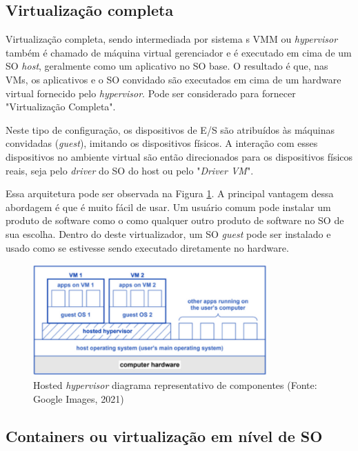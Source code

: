 \subsection{Virtualização completa}

Virtualização completa, sendo intermediada por sistema s VMM ou \emph{hypervisor} também é chamado de máquina virtual gerenciador e é executado em cima de um SO \emph{host}, geralmente como um aplicativo no SO base. O resultado é que, nas VMs, os aplicativos e o SO convidado são executados em cima de um hardware virtual fornecido pelo \emph{hypervisor}. Pode ser considerado para fornecer "Virtualização Completa".

Neste tipo de configuração, os dispositivos de E/S são atribuídos às máquinas convidadas (\emph{guest}), imitando os dispositivos físicos. A interação com esses dispositivos no ambiente virtual são então direcionados para os dispositivos físicos reais, seja pelo \emph{driver} do SO do host ou pelo "\emph{Driver VM}". 

Essa arquitetura pode ser observada na Figura \ref{fig:vms}. A principal vantagem dessa abordagem é que é muito fácil de usar. Um usuário comum pode instalar um produto de software como o  como qualquer outro produto de software no SO de sua escolha. Dentro do deste virtualizador, um SO \emph{guest} pode ser instalado e usado como se estivesse sendo executado diretamente no hardware. \cite{portnoy2012virtualization}

\begin{figure}[!h]
    \centering
    \includegraphics[width=0.8\textwidth]{04-figuras/vms.png}
    \caption[Hosted \emph{hypervisor} diagrama representativo de componentes ]{Hosted \emph{hypervisor} diagrama representativo de componentes (Fonte: Google Images, 2021)}
    \label{fig:vms}
\end{figure}

\subsection{Containers ou virtualização em nível de SO}

